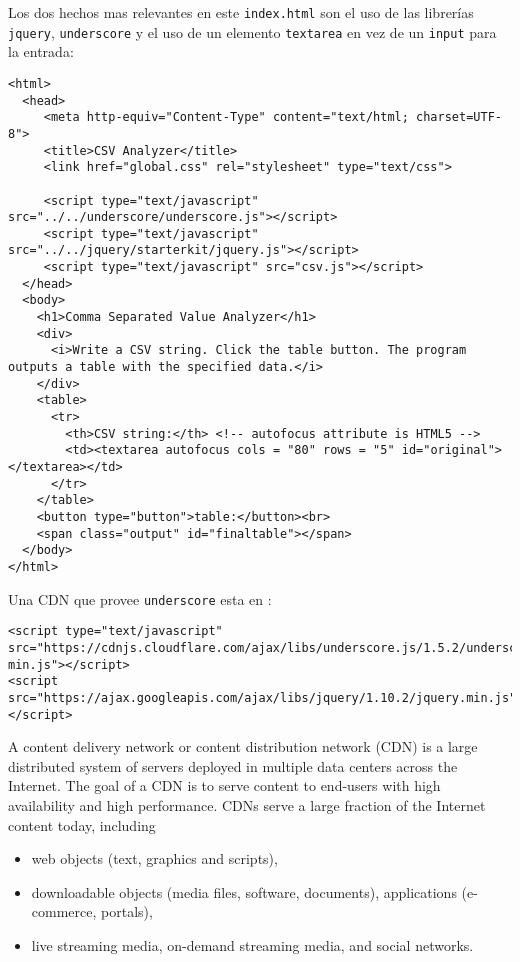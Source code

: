 Los dos hechos mas relevantes en este \verb|index.html| son el uso de las librerías 
\verb|jquery|, \verb|underscore| y el uso de un elemento \verb|textarea| en vez de un \verb|input| para la entrada:
\begin{verbatim}
<html>
  <head>
     <meta http-equiv="Content-Type" content="text/html; charset=UTF-8">
     <title>CSV Analyzer</title>
     <link href="global.css" rel="stylesheet" type="text/css">

     <script type="text/javascript" src="../../underscore/underscore.js"></script>
     <script type="text/javascript" src="../../jquery/starterkit/jquery.js"></script>
     <script type="text/javascript" src="csv.js"></script>
  </head>
  <body>
    <h1>Comma Separated Value Analyzer</h1>
    <div>
      <i>Write a CSV string. Click the table button. The program outputs a table with the specified data.</i>
    </div>
    <table>
      <tr>
        <th>CSV string:</th> <!-- autofocus attribute is HTML5 -->
        <td><textarea autofocus cols = "80" rows = "5" id="original"></textarea></td> 
      </tr>
    </table>
    <button type="button">table:</button><br>
    <span class="output" id="finaltable"></span>
  </body>
</html>
\end{verbatim}








Una CDN que provee \verb|underscore| esta en 
:
\begin{verbatim}
<script type="text/javascript" src="https://cdnjs.cloudflare.com/ajax/libs/underscore.js/1.5.2/underscore-min.js"></script>
<script src="https://ajax.googleapis.com/ajax/libs/jquery/1.10.2/jquery.min.js"></script>
\end{verbatim}

A content delivery network or content distribution network (CDN) is a
large distributed system of servers deployed in multiple data centers
across the Internet. The goal of a CDN is to serve content to end-users
with high availability and high performance. CDNs serve a large fraction
of the Internet content today, including 
\begin{itemize}
\item
web objects (text, graphics and scripts), 
\item
downloadable objects (media files, software, documents), applications (e-commerce, portals), 
\item
live streaming media, on-demand
streaming media, and social networks.
\end{itemize}

